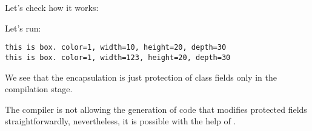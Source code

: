 Let's check how it works:



Let's run:

\begin{lstlisting}
this is box. color=1, width=10, height=20, depth=30
this is box. color=1, width=123, height=20, depth=30
\end{lstlisting}

We see that the encapsulation is just protection of class fields only in the compilation stage.

The \Cpp compiler is not allowing the generation of code that modifies protected 
fields straightforwardly, nevertheless,
it is possible with the help of .

